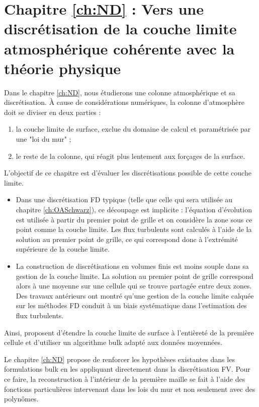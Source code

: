 \section*{Chapitre \ref{ch:ND} : Vers une discrétisation de la couche limite atmosphérique cohérente avec la théorie physique}
Dans le chapitre \ref{ch:ND}, nous étudierons une colonne atmosphérique et sa discrétisation.
À cause de considérations numériques, la colonne
d'atmosphère doit se diviser en deux parties :
\begin{enumerate}
	\item
	la couche limite de surface, exclue du domaine
	de calcul et paramétrisée par une "loi du mur" ;
	\item
	le reste de la colonne, qui réagit plus lentement
	aux forçages de la surface.
\end{enumerate}
L'objectif de ce chapitre est d'évaluer les discrétisations possible
de cette couche limite.
\begin{itemize}
	\item
Dans une discrétisation FD typique (telle que celle qui sera
utilisée au chapitre \ref{ch:OASchwarz}), ce découpage est implicite :
l'équation d'évolution est utilisée à partir
du premier point de grille et on considère la zone
sous ce point comme la couche limite.
Les flux turbulents sont calculés à l'aide de la solution
	au premier point de grille, ce qui correspond donc à
	l'extrémité supérieure de la couche limite.
\item La construction de discrétisations en volumes finis
	est moins souple dans sa gestion de la couche limite.
	La solution au premier point de grille correspond
	alors à une moyenne sur une cellule qui se trouve
	partagée entre deux zones.
	Des travaux antérieurs ont montré qu'une gestion
	de la couche limite calquée sur les méthodes FD
	conduit à un biais systématique dans l'estimation
	des flux turbulents.
\end{itemize}
Ainsi, \citep{nishizawa_surface_2018} proposent
d'étendre la couche limite de surface à l'entièreté de
la première cellule et d'utiliser un algorithme bulk
adapté aux données moyennées.
\par
Le chapitre \ref{ch:ND} propose de renforcer les hypothèses
	existantes dans les formulations bulk en les
	appliquant directement dans la discrétisation FV.
	Pour ce faire, la reconstruction à l'intérieur
	de la première maille se fait à l'aide des fonctions
	particulières intervenant dans les lois du mur et
	non seulement avec des polynômes.
\par
